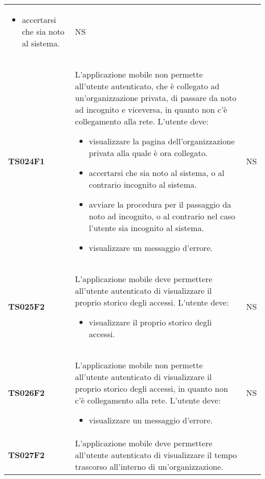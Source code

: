 \documentclass[../piano-di-qualifica.tex]{subfiles}
\begin{document}
\begin{centering}
\begin{longtable}[H]{>{\centering\bfseries}m{3cm} >{}p{10cm} >{\centering\arraybackslash}m{3cm}}
\begin{itemize}
                        \item accertarsi che sia noto al sistema.
                      \end{itemize}
                    & NS \\
        TS024F1     & L'applicazione mobile non permette all'utente autenticato, che è collegato ad un'organizzazione privata, di passare da noto ad incognito e viceversa, in quanto non c'è collegamento alla rete. \newline
                      L'utente deve:
                      \begin{itemize}
                        \item visualizzare la pagina dell'organizzazione privata alla quale è ora collegato.
                        \item accertarsi che sia noto al sistema, o al contrario incognito al sistema.
                        \item avviare la procedura per il passaggio da noto ad incognito, o al contrario nel caso l'utente sia incognito al sistema.
                        \item visualizzare un messaggio d'errore.
                      \end{itemize}
                    & NS \\
        TS025F2     & L'applicazione mobile deve permettere all'utente autenticato di visualizzare il proprio storico degli accessi. \newline
                      L'utente deve:
                      \begin{itemize}
                        \item visualizzare il proprio storico degli accessi.
                      \end{itemize}
                    & NS \\
        TS026F2     & L'applicazione mobile non permette all'utente autenticato di visualizzare il proprio storico degli accessi, in quanto non c'è collegamento alla rete. \newline
                      L'utente deve:
                      \begin{itemize}
                        \item visualizzare un messaggio d'errore.
                      \end{itemize}
                    & NS \\
        TS027F2     & L'applicazione mobile deve permettere all'utente autenticato di visualizzare il tempo trascorso all'interno di un'organizzazione. \newline

\end{longtable}
\end{centering}
\end{document}
